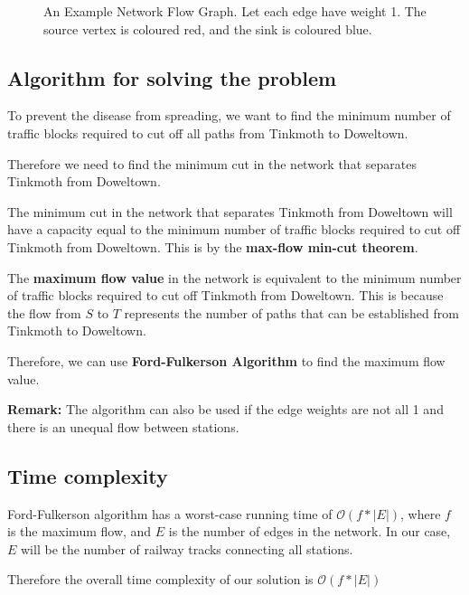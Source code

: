 \documentclass[12pt]{article}
\begin{document}
\begin{figure}[ht]
\centering
{}

\caption{An Example Network Flow Graph. Let each edge have weight 1. The source vertex is coloured red, and the sink is coloured blue.}
\label{fig:network_flow}
\end{figure}


\subsection{Algorithm for solving the problem}
To prevent the disease from spreading, we want to find the minimum number of traffic blocks required to cut off all paths from Tinkmoth to Doweltown.

Therefore we need to find the minimum cut in the network that separates Tinkmoth from Doweltown.

The minimum cut in the network that separates Tinkmoth from Doweltown will have a capacity equal to the minimum number of traffic blocks required to cut off Tinkmoth from Doweltown.
This is by the {\textbf{max-flow min-cut theorem}}.

 The {\textbf{maximum flow value}} in the network is equivalent to the minimum number of traffic blocks required to cut off Tinkmoth from Doweltown. This is because the flow from $S$ to $T$ represents the number of paths that can be established from Tinkmoth to Doweltown.

 Therefore, we can use {\textbf{Ford-Fulkerson Algorithm}} to find the maximum flow value.

\textbf{Remark:} The algorithm can also be used if the edge weights are not all 1 and there is an unequal flow between stations. 


 \subsection{Time complexity}

Ford-Fulkerson algorithm has a worst-case running time of $\mathcal{O}(f*|E|)$, where $f$ is the maximum flow, and $E$ is the number of edges in the network.
 In our case, $E$ will be the number of railway tracks connecting all stations. 
 
 Therefore the overall time complexity of our solution is $\mathcal{O}(f*|E|)$
\end{document}
